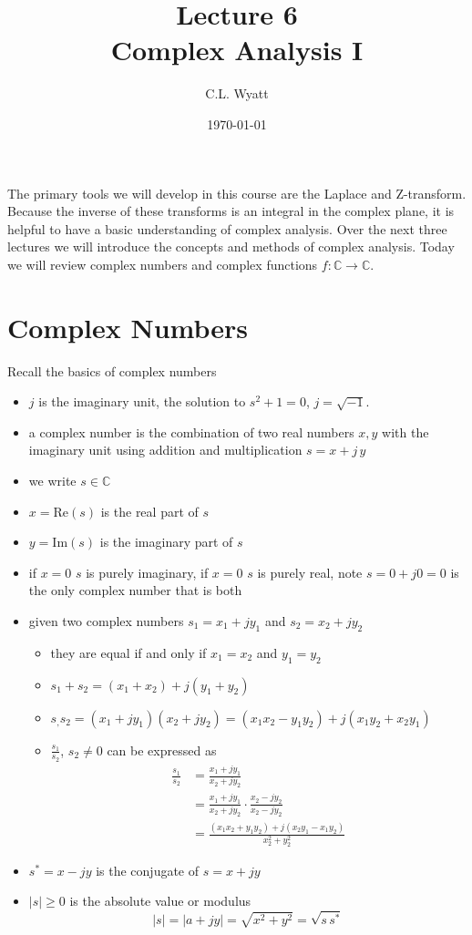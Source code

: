 \documentclass{article}
\begin{document}
\title{Lecture 6\\ Complex Analysis I}
\author{C.L. Wyatt}
\date{\today}
\maketitle

The primary tools we will develop in this course are the Laplace and Z-transform. Because the inverse of these transforms is an integral in the complex plane, it is helpful to have a basic understanding of complex analysis. Over the next three lectures we will introduce the concepts and methods of complex analysis. Today we will review complex numbers and complex functions $f: \mathbb{C} \rightarrow \mathbb{C}$.

\section{Complex Numbers}

Recall the basics of complex numbers

\begin{itemize}
\item $j$ is the imaginary unit, the solution to $s^2 + 1 = 0$, $j = \sqrt{-1}$.
\item a complex number is the combination of two real numbers $x,y$ with the imaginary unit using addition and multiplication $s = x + j\, y$
\item we write $s\in\mathbb{C}$
\item $x = \text{Re}(s)$ is the real part of $s$
\item $y = \text{Im}(s)$ is the imaginary part of $s$
\item if $x=0$ $s$ is purely imaginary, if $x=0$ $s$ is purely real, note $s = 0+j0 = 0$ is the only complex number that is both
\item given two complex numbers $s_1 = x_1 + jy_1$ and $s_2 = x_2 + jy_2$
  \begin{itemize}
  \item they are equal if and only if $x_1 = x_2$ and $y_1 = y_2$
  \item $s_1 + s_2 = (x_1 + x_2) + j(y_1 + y_2)$
  \item $s_, s_2 = (x_1 + jy_1)(x_2 + jy_2) = (x_1x_2 - y_1y_2) + j(x_1y_2 + x_2y_1)$
  \item $\frac{s_1}{s_2}$, $s_2 \neq 0$ can be expressed as
    \begin{align}
      \frac{s_1}{s_2} &= \frac{x_1 + jy_1}{x_2 + jy_2}\\
      &= \frac{x_1 + jy_1}{x_2 + jy_2}\cdot \frac{x_2 - jy_2}{x_2 - jy_2}\\
      &= \frac{(x_1x_2 + y_1y_2) + j(x_2y_1 - x_1y_2)}{x_2^2 + y_2^2} 
    \end{align}
  \end{itemize}
\item $s^* = x - jy$ is the conjugate of $s = x+jy$
\item $|s| \geq 0$ is the absolute value or modulus
  \[
  |s| = |a +jy| = \sqrt{x^2 + y^2} = \sqrt{s\, s^*}
  \]
\end{itemize}
\end{document}
